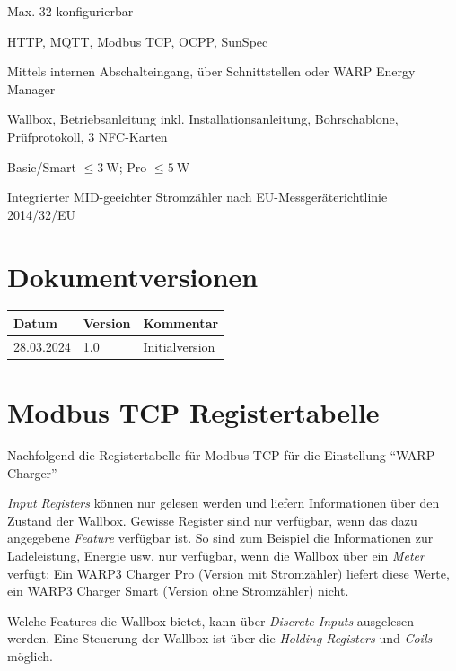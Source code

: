 \documentclass[a4paper,10pt]{article}
\begin{document}
\begin{multicols*}{2}
\begin{minipage}{\linewidth}
\begin{description}[leftmargin=!,labelwidth=\widthof{\textbf{Fehlerstromerkennung}}]
            \item[Benutzer] Max. 32 konfigurierbar~
            \item[Schnittstellen] HTTP, MQTT, Modbus TCP, OCPP, SunSpec~
            \item[\S14a EnWG steuerbar] Mittels internen Abschalteingang, über Schnittstellen oder WARP Energy Manager
            \item[Lieferumfang] Wallbox, Betriebsanleitung inkl. Installationsanleitung, Bohrschablone, Prüfprotokoll, 3 NFC-Karten

            \item[Standby, WLAN an] Basic/Smart $\leq\SI{3}{\watt}$; Pro $\leq\SI{5}{\watt}$
            \item[Strommessung] Integrierter MID-geeichter Strom\-zähler nach EU-Messgeräterichtlinie 2014/32/EU~




        \end{description}
    \end{minipage}

    \section{Dokumentversionen}
    \begin{tabular}{lll}
        \toprule
        Datum      & Version\hspace{-0.2pt} & Kommentar        \\
        \midrule
        28.03.2024 & 1.0     & Initialversion                  \\
        \bottomrule
    \end{tabular}


\end{multicols*}

\appendix

\begin{minipage}{0.49\linewidth}
 \section{Modbus TCP Registertabelle}
\label{modbus_tcp_registertabelle}
Nachfolgend die Registertabelle für Modbus TCP für die Einstellung \enquote{WARP
Charger}

\textit{Input Registers} können nur gelesen werden und liefern Informationen über den
Zustand der Wallbox. Gewisse Register sind nur verfügbar, wenn das dazu
angegebene \textit{Feature} verfügbar ist. So sind zum Beispiel die
Informationen zur Ladeleistung, Energie usw. nur verfügbar, wenn die Wallbox
über ein \textit{Meter} verfügt: Ein WARP3 Charger Pro (Version mit
Stromzähler) liefert diese Werte, ein WARP3 Charger Smart (Version ohne
Stromzähler) nicht.

Welche Features die Wallbox bietet, kann über \textit{Discrete Inputs} ausgelesen
werden. Eine Steuerung der Wallbox ist über die \textit{Holding Registers} und \textit{Coils}
möglich.
\end{minipage}
\end{document}
